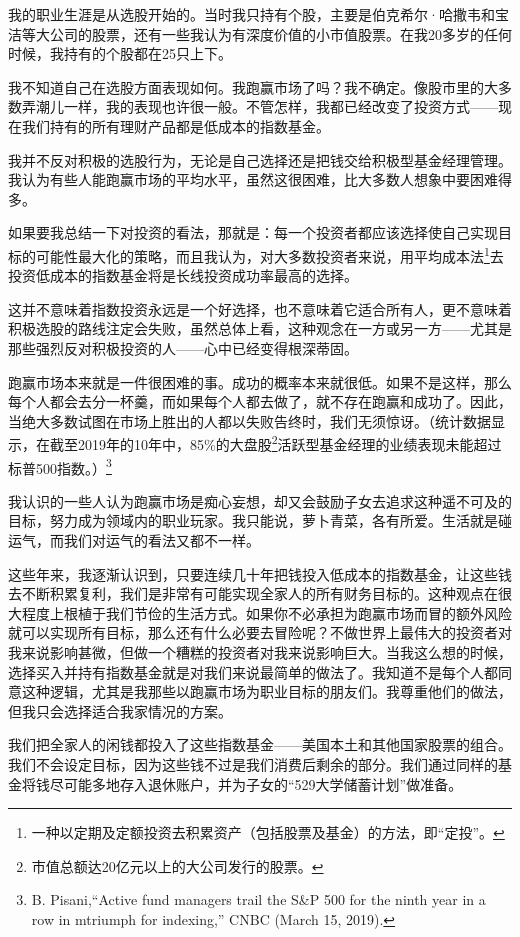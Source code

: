 我的职业生涯是从选股开始的。当时我只持有个股，主要是伯克希尔·哈撒韦和宝洁等大公司的股票，还有一些我认为有深度价值的小市值股票。在我20多岁的任何时候，我持有的个股都在25只上下。

我不知道自己在选股方面表现如何。我跑赢市场了吗？我不确定。像股市里的大多数弄潮儿一样，我的表现也许很一般。不管怎样，我都已经改变了投资方式——现在我们持有的所有理财产品都是低成本的指数基金。

我并不反对积极的选股行为，无论是自己选择还是把钱交给积极型基金经理管理。我认为有些人能跑赢市场的平均水平，虽然这很困难，比大多数人想象中要困难得多。

如果要我总结一下对投资的看法，那就是：每一个投资者都应该选择使自己实现目标的可能性最大化的策略，而且我认为，对大多数投资者来说，用平均成本法\footnote{一种以定期及定额投资去积累资产（包括股票及基金）的方法，即“定投”。}去投资低成本的指数基金将是长线投资成功率最高的选择。

这并不意味着指数投资永远是一个好选择，也不意味着它适合所有人，更不意味着积极选股的路线注定会失败，虽然总体上看，这种观念在一方或另一方——尤其是那些强烈反对积极投资的人——心中已经变得根深蒂固。

跑赢市场本来就是一件很困难的事。成功的概率本来就很低。如果不是这样，那么每个人都会去分一杯羹，而如果每个人都去做了，就不存在跑赢和成功了。因此，当绝大多数试图在市场上胜出的人都以失败告终时，我们无须惊讶。（统计数据显示，在截至2019年的10年中，85\%的大盘股\footnote{市值总额达20亿元以上的大公司发行的股票。}活跃型基金经理的业绩表现未能超过标普500指数。）\footnote{B. Pisani,“Active fund managers trail the S\&P 500 for the ninth year in a row in mtriumph for indexing,” CNBC (March 15, 2019).}

我认识的一些人认为跑赢市场是痴心妄想，却又会鼓励子女去追求这种遥不可及的目标，努力成为领域内的职业玩家。我只能说，萝卜青菜，各有所爱。生活就是碰运气，而我们对运气的看法又都不一样。

这些年来，我逐渐认识到，只要连续几十年把钱投入低成本的指数基金，让这些钱去不断积累复利，我们是非常有可能实现全家人的所有财务目标的。这种观点在很大程度上根植于我们节俭的生活方式。如果你不必承担为跑赢市场而冒的额外风险就可以实现所有目标，那么还有什么必要去冒险呢？不做世界上最伟大的投资者对我来说影响甚微，但做一个糟糕的投资者对我来说影响巨大。当我这么想的时候，选择买入并持有指数基金就是对我们来说最简单的做法了。我知道不是每个人都同意这种逻辑，尤其是我那些以跑赢市场为职业目标的朋友们。我尊重他们的做法，但我只会选择适合我家情况的方案。

我们把全家人的闲钱都投入了这些指数基金——美国本土和其他国家股票的组合。我们不会设定目标，因为这些钱不过是我们消费后剩余的部分。我们通过同样的基金将钱尽可能多地存入退休账户，并为子女的“529大学储蓄计划”做准备。

